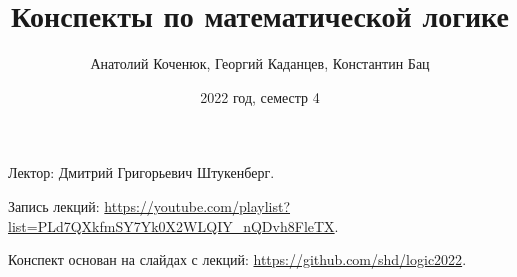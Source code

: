\documentclass[10pt]{article}
\title{Конспекты по математической логике}
\author{Анатолий Коченюк, Георгий Каданцев, Константин Бац}
\date{2022 год, семестр 4}
\begin{document}
\maketitle

Лектор: Дмитрий Григорьевич Штукенберг.

Запись лекций: \url{https://youtube.com/playlist?list=PLd7QXkfmSY7Yk0X2WLQIY_nQDvh8FleTX}.

Конспект основан на слайдах с лекций: \url{https://github.com/shd/logic2022}.














\end{document}
